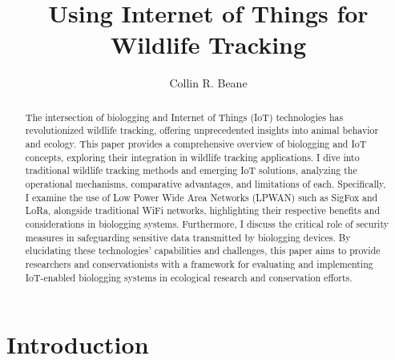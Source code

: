 \documentclass[sigplan,screen,nonacm]{acmart}
\begin{document}
\title[IoT for Wildlife Tracking]{Using Internet of Things for Wildlife Tracking}

\author{Collin R. Beane}

\begin{abstract}
  The intersection of biologging and Internet of Things (IoT) technologies has revolutionized wildlife tracking, 
  offering unprecedented insights into animal behavior and ecology. This paper provides a comprehensive overview 
  of biologging and IoT concepts, exploring their integration in wildlife tracking applications. I dive into 
  traditional wildlife tracking methods and emerging IoT solutions, analyzing the operational mechanisms, comparative 
  advantages, and limitations of each. Specifically, I examine the use of Low Power Wide Area Networks (LPWAN) such 
  as SigFox and LoRa, alongside traditional WiFi networks, highlighting their respective benefits and considerations 
  in biologging systems. Furthermore, I discuss the critical role of security measures in safeguarding sensitive data 
  transmitted by biologging devices. By elucidating these technologies' capabilities and challenges, this paper aims 
  to provide researchers and conservationists with a framework for evaluating and implementing IoT-enabled biologging 
  systems in ecological research and conservation efforts.
\end{abstract}

\doclicenseThis



\maketitle

\section{Introduction}
\label{sec:introduction}
\end{document}
